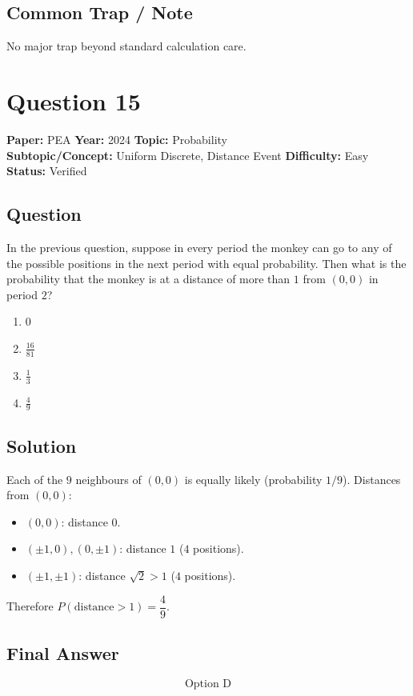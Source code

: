 \documentclass[11pt]{article}
\begin{document}
\subsection*{Common Trap / Note}
No major trap beyond standard calculation care.

\section*{Question 15}
\textbf{Paper:} PEA \quad \textbf{Year:} 2024 \quad \textbf{Topic:} Probability \\
\textbf{Subtopic/Concept:} Uniform Discrete, Distance Event \quad \textbf{Difficulty:} Easy \quad \textbf{Status:} Verified

\subsection*{Question}
In the previous question, suppose in every period the monkey can go to any of the possible positions in the next period with equal probability. Then what is the probability that the monkey is at a distance of more than $1$ from $(0,0)$ in period $2$?
\begin{enumerate}[label=(\Alph*)]
\item $0$
\item $\tfrac{16}{81}$
\item $\tfrac{1}{3}$
\item $\tfrac{4}{9}$
\end{enumerate}

\subsection*{Solution}
Each of the $9$ neighbours of $(0,0)$ is equally likely (probability $1/9$). Distances from $(0,0)$:
\begin{itemize}[leftmargin=*]
\item $(0,0)$: distance $0$.
\item $(\pm 1,0),(0,\pm 1)$: distance $1$ ($4$ positions).
\item $(\pm 1,\pm 1)$: distance $\sqrt{2}>1$ ($4$ positions).
\end{itemize}
Therefore $P(\text{distance}>1)=\dfrac{4}{9}$.

\subsection*{Final Answer}
\[
\boxed{\text{Option D}}
\]
\end{document}
